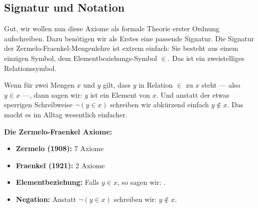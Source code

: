 \begin{ai-global-state-checkpoint-invisible-content}
\end{ai-global-state-checkpoint-invisible-content}

\subsection{Signatur und Notation}

\begin{spoken-clean}[01:15:50 - 01:18:40]
Gut, wir wollen nun diese Axiome als formale Theorie erster Ordnung aufschreiben. Dazu benötigen wir als Erstes eine passende Signatur. Die Signatur der Zermelo-Fraenkel-Mengenlehre ist extrem einfach: Sie besteht aus einem einzigen Symbol, dem Elementbeziehungs-Symbol $\in$. Das ist ein zweistelliges Relationssymbol.

Wenn für zwei Mengen $x$ und $y$ gilt, dass $y$ in Relation $\in$ zu $x$ steht --- also $y \in x$ ---, dann sagen wir: $y$ ist ein Element von $x$. Und anstatt der etwas sperrigen Schreibweise $\neg(y \in x)$ schreiben wir abkürzend einfach $y \notin x$. Das macht es im Alltag wesentlich einfacher.
\end{spoken-clean}

\begin{math-stroke}
\textbf{Die Zermelo-Fraenkel Axiome:}
\begin{itemize}
    \item \textbf{Zermelo (1908):} 7 Axiome
    \item \textbf{Fraenkel (1921):} 2 Axiome
\end{itemize}


\begin{notation}
\begin{itemize}
    \item \textbf{Elementbeziehung:} Falls $y \in x$, so sagen wir: .
    \item \textbf{Negation:} Anstatt $\neg(y \in x)$ schreiben wir: $y \notin x$.
\end{itemize}
\end{notation}
\end{math-stroke}

